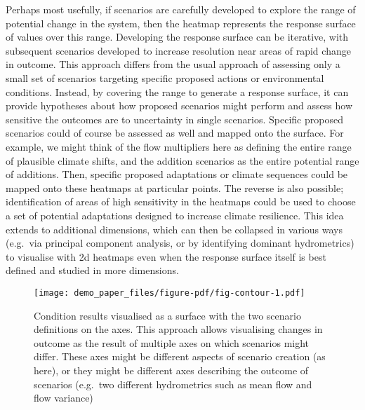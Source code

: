 \documentclass[
  number]{elsarticle}
\begin{document}
Perhaps most usefully, if scenarios are carefully developed to explore
the range of potential change in the system, then the heatmap represents
the response surface of values over this range. Developing the response
surface can be iterative, with subsequent scenarios developed to
increase resolution near areas of rapid change in outcome. This approach
differs from the usual approach of assessing only a small set of
scenarios targeting specific proposed actions or environmental
conditions. Instead, by covering the range to generate a response
surface, it can provide hypotheses about how proposed scenarios might
perform and assess how sensitive the outcomes are to uncertainty in
single scenarios. Specific proposed scenarios could of course be
assessed as well and mapped onto the surface. For example, we might
think of the flow multipliers here as defining the entire range of
plausible climate shifts, and the addition scenarios as the entire
potential range of additions. Then, specific proposed adaptations or
climate sequences could be mapped onto these heatmaps at particular
points. The reverse is also possible; identification of areas of high
sensitivity in the heatmaps could be used to choose a set of potential
adaptations designed to increase climate resilience. This idea extends
to additional dimensions, which can then be collapsed in various ways
(e.g.~via principal component analysis, or by identifying dominant
hydrometrics) to visualise with 2d heatmaps even when the response
surface itself is best defined and studied in more dimensions.

\begin{figure}

{\centering \texttt{[image: demo\_paper\_files/figure-pdf/fig-contour-1.pdf]}

}

\caption{\label{fig-contour}Condition results visualised as a surface
with the two scenario definitions on the axes. This approach allows
visualising changes in outcome as the result of multiple axes on which
scenarios might differ. These axes might be different aspects of
scenario creation (as here), or they might be different axes describing
the outcome of scenarios (e.g.~two different hydrometrics such as mean
flow and flow variance)}

\end{figure}
\end{document}
